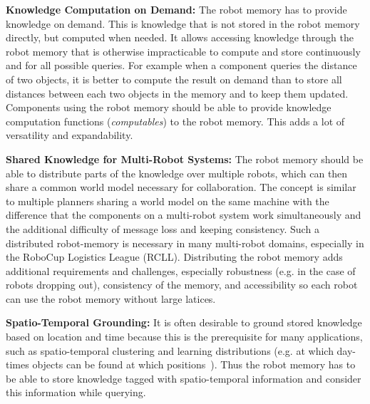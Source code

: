 \smallskip
\textbf{Knowledge Computation on Demand:} The robot memory has to
provide knowledge on demand. This is knowledge that is not stored in
the robot memory directly, but computed when needed. It allows
accessing knowledge through the robot memory that is otherwise
impracticable to compute and store continuously and for all possible
queries. For example when a component queries the distance of two
objects, it is better to compute the result on demand than to store
all distances between each two objects in the memory and to keep them
updated. Components using the robot memory should be able to provide
knowledge computation functions (\textit{computables}) to the robot
memory. This adds a lot of versatility and expandability.

\smallskip
\textbf{Shared Knowledge for Multi-Robot Systems:} The robot memory
should be able to distribute parts of the knowledge over multiple
robots, which can then share a common world model necessary for
collaboration. The concept is similar to multiple planners sharing a
world model on the same machine with the difference that the
components on a multi-robot system work simultaneously and the
additional difficulty of message loss and keeping consistency. Such a
distributed robot-memory is necessary in many multi-robot domains,
especially in the RoboCup Logistics League (RCLL).
Distributing the robot memory adds
additional requirements and challenges, especially robustness (e.g. in
the case of robots dropping out), consistency of the memory, and
accessibility so each robot can use the robot memory without large
latices.

\smallskip
\textbf{Spatio-Temporal Grounding:} It is often desirable to ground
stored knowledge based on location and time because this is the
prerequisite for many applications, such as spatio-temporal clustering
and learning distributions (e.g. at which day-times objects can be
found at which positions~\cite{deebul}). Thus the robot
memory has to be able to store knowledge tagged with spatio-temporal
information and consider this information while querying.

